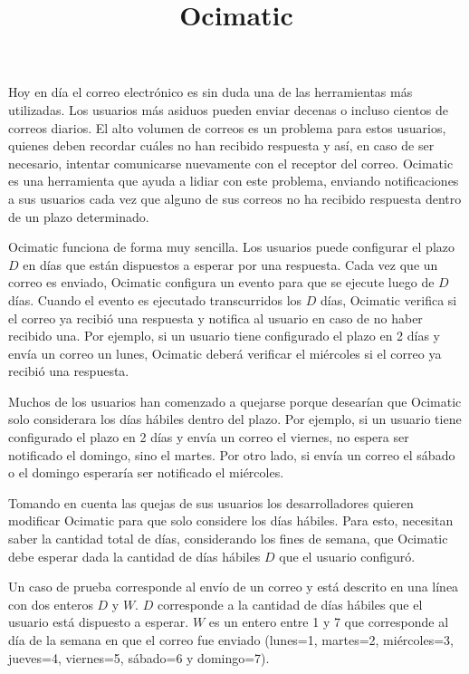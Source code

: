 \documentclass{oci}
\title{Ocimatic}
\begin{document}
\begin{problemDescription}
  Hoy en día el correo electrónico es sin duda una de las herramientas más
  utilizadas.
  Los usuarios más asiduos pueden enviar decenas o incluso cientos de correos
  diarios.
  El alto volumen de correos es un problema para estos usuarios, quienes deben
  recordar cuáles no han recibido respuesta y así, en caso de ser necesario,
  intentar comunicarse nuevamente con el receptor del correo.
  Ocimatic es una herramienta que ayuda a lidiar con este problema, enviando
  notificaciones a sus usuarios cada vez que alguno de sus correos no ha
  recibido respuesta dentro de un plazo determinado.
  
  Ocimatic funciona de forma muy sencilla.
  Los usuarios puede configurar el plazo $D$ en días que están dispuestos a
  esperar por una respuesta.
  Cada vez que un correo es enviado, Ocimatic configura un evento para que se
  ejecute luego de $D$ días.
  Cuando el evento es ejecutado transcurridos los $D$ días, Ocimatic verifica
  si el correo ya recibió una respuesta y notifica al usuario en caso de no
  haber recibido una.
  Por ejemplo, si un usuario tiene configurado el plazo en 2 días y envía un
  correo un lunes, Ocimatic deberá verificar el miércoles si el correo ya recibió
  una respuesta.

  Muchos de los usuarios han comenzado a quejarse porque desearían que Ocimatic
  solo considerara los días hábiles dentro del plazo.
  Por ejemplo, si un usuario tiene configurado el plazo en 2 días y envía un
  correo el viernes, no espera ser notificado el domingo, sino el martes.
  Por otro lado, si envía un correo el sábado o el domingo esperaría ser
  notificado el miércoles.

  Tomando en cuenta las quejas de sus usuarios los desarrolladores quieren
  modificar Ocimatic para que solo considere los días hábiles.
  Para esto, necesitan saber la cantidad total de días, considerando los fines
  de semana, que Ocimatic debe esperar dada la cantidad de días hábiles $D$ que
  el usuario configuró.
\end{problemDescription}

\begin{inputDescription}
  Un caso de prueba corresponde al envío de un correo y está descrito en una
  línea con dos enteros $D$ y $W$.
  $D$ corresponde a la cantidad de días hábiles que el usuario está dispuesto a
  esperar.
  $W$ es un entero entre 1 y 7 que corresponde al día de la semana en que el
  correo fue enviado (lunes=1, martes=2, miércoles=3, jueves=4, viernes=5,
  sábado=6 y domingo=7).
\end{inputDescription}
\end{document}
